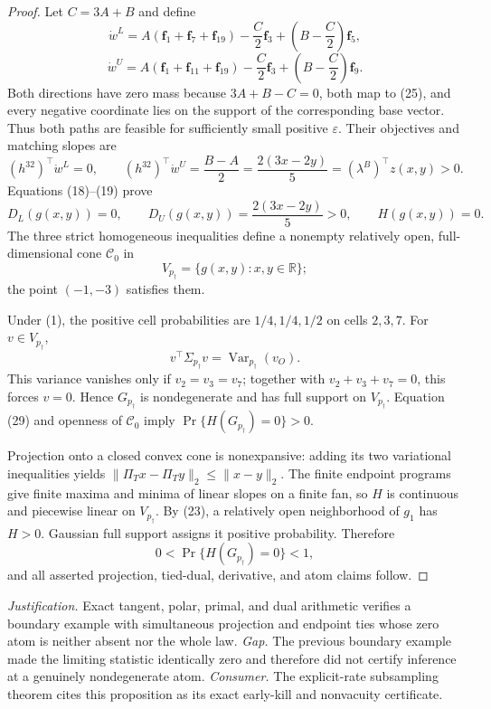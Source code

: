 \documentclass{article}
\begin{document}
\begin{proof}
Let \(C=3A+B\) and define
\[
\dot w^L=A(\mathbf f_1+\mathbf f_7+\mathbf f_{19})
-\frac C2\mathbf f_3+\left(B-\frac C2\right)\mathbf f_5,
\tag{27}
\]
\[
\dot w^U=A(\mathbf f_1+\mathbf f_{11}+\mathbf f_{19})
-\frac C2\mathbf f_3+\left(B-\frac C2\right)\mathbf f_9.
\tag{28}
\]
Both directions have zero mass because \(3A+B-C=0\), both map to (25), and every negative coordinate lies on the support of the corresponding base vector.  Thus both paths are feasible for sufficiently small positive \(\varepsilon\).  Their objectives and matching slopes are
\[
(h^{32})^{\top}\dot w^L=0,
\qquad
(h^{32})^{\top}\dot w^U=\frac{B-A}{2}
=\frac{2(3x-2y)}5
=(\lambda^B)^{\top}z(x,y)>0.
\]
Equations (18)--(19) prove
\[
D_L(g(x,y))=0,
\qquad
D_U(g(x,y))=\frac{2(3x-2y)}5>0,
\qquad
H(g(x,y))=0.
\tag{29}
\]
The three strict homogeneous inequalities define a nonempty relatively open, full-dimensional cone \(\mathcal C_0\) in
\[
V_{p_\dagger}=\{g(x,y):x,y\in\mathbb R\};
\]
the point \((-1,-3)\) satisfies them.

Under (1), the positive cell probabilities are \(1/4,1/4,1/2\) on cells \(2,3,7\).  For \(v\in V_{p_\dagger}\),
\[
v^{\top}\Sigma_{p_\dagger}v=\operatorname{Var}_{p_\dagger}(v_O).
\tag{30}
\]
This variance vanishes only if \(v_2=v_3=v_7\); together with \(v_2+v_3+v_7=0\), this forces \(v=0\).  Hence \(G_{p_\dagger}\) is nondegenerate and has full support on \(V_{p_\dagger}\).  Equation (29) and openness of \(\mathcal C_0\) imply \(\Pr\{H(G_{p_\dagger})=0\}>0\).

Projection onto a closed convex cone is nonexpansive: adding its two variational inequalities yields \(\|\Pi_Tx-\Pi_Ty\|_2\leq\|x-y\|_2\).  The finite endpoint programs give finite maxima and minima of linear slopes on a finite fan, so \(H\) is continuous and piecewise linear on \(V_{p_\dagger}\).  By (23), a relatively open neighborhood of \(g_1\) has \(H>0\).  Gaussian full support assigns it positive probability.  Therefore
\[
0<\Pr\{H(G_{p_\dagger})=0\}<1,
\]
and all asserted projection, tied-dual, derivative, and atom claims follow.
\end{proof}
\par\smallskip\noindent \textit{Justification.} Exact tangent, polar, primal, and dual arithmetic verifies a boundary example with simultaneous projection and endpoint ties whose zero atom is neither absent nor the whole law. \textit{Gap.} The previous boundary example made the limiting statistic identically zero and therefore did not certify inference at a genuinely nondegenerate atom. \textit{Consumer.} The explicit-rate subsampling theorem cites this proposition as its exact early-kill and nonvacuity certificate.
\end{document}
